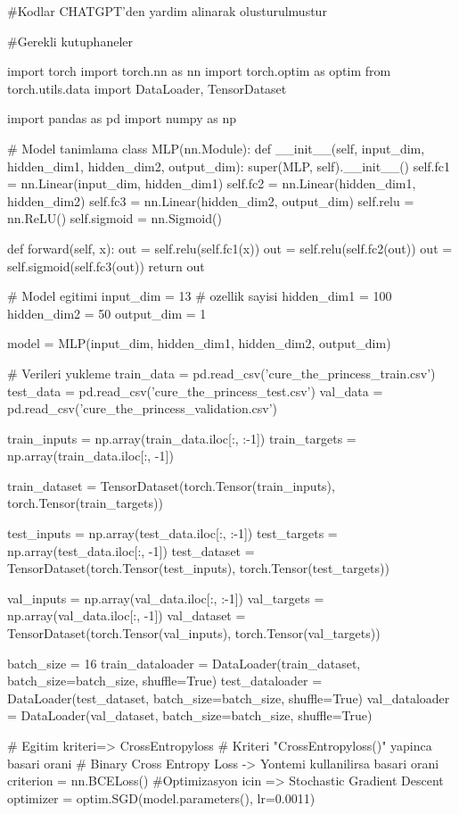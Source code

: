 \documentclass[11pt]{article}
\begin{document}
\begin{python}
#Kodlar CHATGPT'den yardim alinarak olusturulmustur

#Gerekli kutuphaneler

import torch
import torch.nn as nn
import torch.optim as optim
from torch.utils.data import DataLoader, TensorDataset

import pandas as pd
import numpy as np

# Model tanimlama
class MLP(nn.Module):
    def __init__(self, input_dim, hidden_dim1, hidden_dim2, output_dim):
        super(MLP, self).__init__()
        self.fc1 = nn.Linear(input_dim, hidden_dim1)
        self.fc2 = nn.Linear(hidden_dim1, hidden_dim2)
        self.fc3 = nn.Linear(hidden_dim2, output_dim)
        self.relu = nn.ReLU()
        self.sigmoid = nn.Sigmoid()
        
    def forward(self, x):
        out = self.relu(self.fc1(x))
        out = self.relu(self.fc2(out))
        out = self.sigmoid(self.fc3(out))
        return out


# Model egitimi
input_dim = 13 # ozellik sayisi
hidden_dim1 = 100
hidden_dim2 = 50
output_dim = 1

model = MLP(input_dim, hidden_dim1, hidden_dim2, output_dim)

# Verileri yukleme
train_data = pd.read_csv('cure_the_princess_train.csv')
test_data = pd.read_csv('cure_the_princess_test.csv')
val_data = pd.read_csv('cure_the_princess_validation.csv')

train_inputs = np.array(train_data.iloc[:, :-1])
train_targets = np.array(train_data.iloc[:, -1])

train_dataset = TensorDataset(torch.Tensor(train_inputs), torch.Tensor(train_targets))

test_inputs = np.array(test_data.iloc[:, :-1])
test_targets = np.array(test_data.iloc[:, -1])
test_dataset = TensorDataset(torch.Tensor(test_inputs), torch.Tensor(test_targets))

val_inputs = np.array(val_data.iloc[:, :-1])
val_targets = np.array(val_data.iloc[:, -1])
val_dataset = TensorDataset(torch.Tensor(val_inputs), torch.Tensor(val_targets))

batch_size = 16
train_dataloader = DataLoader(train_dataset, batch_size=batch_size, shuffle=True)
test_dataloader = DataLoader(test_dataset, batch_size=batch_size, shuffle=True)
val_dataloader = DataLoader(val_dataset, batch_size=batch_size, shuffle=True)

# Egitim kriteri=> CrossEntropyloss
# Kriteri  "CrossEntropyloss()" yapinca basari orani %
# Binary Cross Entropy Loss -> Yontemi kullanilirsa basari orani %
criterion = nn.BCELoss()
#Optimizasyon icin => Stochastic Gradient Descent
optimizer = optim.SGD(model.parameters(), lr=0.0011)


\end{python}
\end{document}
